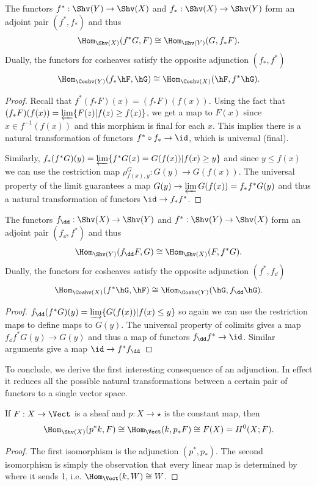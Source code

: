 \begin{thm}
The functors $f^*:\Shv(Y)\to \Shv(X)$ and $f_*:\Shv(X)\to\Shv(Y)$ form an adjoint pair $(f^*,f_*)$ and thus
\[
\Hom_{\Shv(X)}(f^*G,F)\cong \Hom_{\Shv(Y)}(G,f_*F).
\]
Dually, the functors for cosheaves satisfy the opposite adjunction $(f_*,f^*)$
\[
\Hom_{\Coshv(Y)}(f_*\hF,\hG) \cong \Hom_{\Coshv(X)}(\hF,f^*\hG).
\]
\end{thm}
\begin{proof}
	Recall that $f^*(f_*F)(x)=(f_*F)(f(x))$. Using the fact that $(f_*F)(f(x))=\varprojlim\{F(z)|f(z)\geq f(x)\}$, we get a map to $F(x)$ since $x\in f^{-1}(f(x))$ and this morphism is final for each $x$. This implies there is a natural transformation of functors $f^*\circ f_*\to\id$, which is universal (final). 
	
	Similarly, $f_*(f^*G)(y)=\varprojlim\{f^*G(x)=G(f(x))|f(x)\geq y\}$ and since $y\leq f(x)$ we can use the restriction map $\rho^G_{f(x),y}:G(y)\to G(f(x))$. The universal property of the limit guarantees a map $G(y)\to\varprojlim G(f(x))=f_*f^*G(y)$ and thus a natural transformation of functors $\id\to f_*f^*$.
\end{proof}

\begin{thm}
	The functors $f_{\dd}:\Shv(X)\to\Shv(Y)$ and $f^*:\Shv(Y)\to\Shv(X)$ form an adjoint pair $(f_{\dd},f^*)$ and thus
	\[
	\Hom_{\Shv(Y)}(f_{\dd}F,G)\cong\Hom_{\Shv(X)}(F,f^*G).
	\]
	Dually, the functors for cosheaves satisfy the opposite adjunction $(f^*,f_{\dd})$
	\[
	\Hom_{\Coshv(X)}(f^*\hG,\hF) \cong \Hom_{\Coshv(Y)}(\hG,f_{\dd}\hG).
	\]
\end{thm}
\begin{proof}
	$f_{\dd}(f^*G)(y)=\varinjlim \{G(f(x))|f(x)\leq y\}$ so again we can use the restriction maps to define maps to $G(y)$. The universal property of colimits gives a map $f_{\dd}f^*G(y)\to G(y)$ and thus a map of functors $f_{\dd}f^*\to\id$. Similar arguments give a map $\id\to f^*f_{\dd}$
\end{proof}

To conclude, we derive the first interesting consequence of an adjunction. In effect it reduces all the possible natural transformations between a certain pair of functors to a single vector space.
\begin{prop}
	If $F:X\to\Vect$ is a sheaf and $p:X\to\star$ is the constant map, then
	\[
		\Hom_{\Shv(X)}(p^*k,F)\cong \Hom_{\Vect}(k,p_*F)\cong F(X) = H^0(X;F).
	\]
\end{prop}
\begin{proof}
	The first isomorphism is the adjunction $(p^*,p_*)$. The second isomorphism is simply the observation that every linear map is determined by where it sends 1, i.e. $\Hom_{\Vect}(k,W)\cong W$.
\end{proof}
